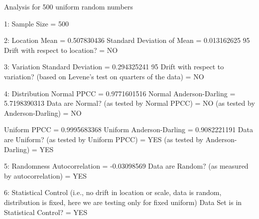  
 
Analysis for 500 uniform random numbers
 
1: Sample Size                           = 500
 
2: Location
   Mean                                  = 0.507830436
   Standard Deviation of Mean            = 0.013162625
   95%
   Drift with respect to location?       = NO
 
3: Variation
   Standard Deviation                    = 0.294325241
   95%
   Drift with respect to variation?
   (based on Levene's test on quarters
   of the data)                          = NO
 
4: Distribution
   Normal PPCC                           = 0.9771601516
   Normal Anderson-Darling               = 5.7198390313
   Data are Normal?
     (as tested by Normal PPCC)          = NO
     (as tested by Anderson-Darling)     = NO
 
   Uniform PPCC                          = 0.9995683368
   Uniform Anderson-Darling              = 0.9082221191
   Data are Uniform?
     (as tested by Uniform PPCC)         = YES
     (as tested by Anderson-Darling)     = YES
 
5: Randomness
   Autocorrelation                       = -0.03098569
   Data are Random?
     (as measured by autocorrelation)    = YES
 
6: Statistical Control
   (i.e., no drift in location or scale,
   data is random, distribution is 
   fixed, here we are testing only for
   fixed uniform)
   Data Set is in Statistical Control?   = YES
 
